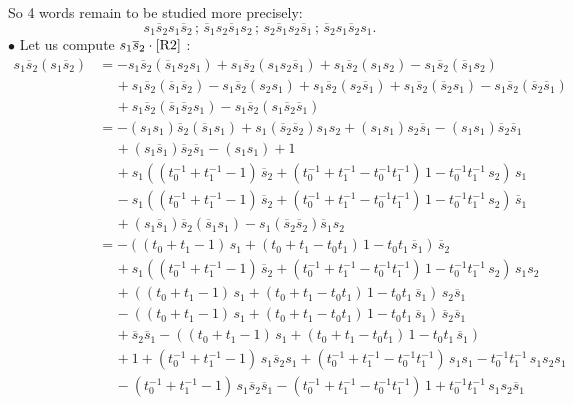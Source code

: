 \documentclass[12pt,reqno]{amsart}
\theoremstyle{definition}
\def\hs{\overline{s}}
\begin{document}
So 4 words remain to be studied more precisely:
$$
s_1 \hs_2 s_1 \hs_2 \,;\, \hs_1 s_2 \hs_1 s_2 \,;\, s_2 \hs_1 s_2 \hs_1
\,;\, \hs_2 s_1 \hs_2 s_1 .
$$
$\bullet$ \ovalbox{Case of $s_1 \hs_2 s_1 \hs_2$.} 
Let us compute $s_1 \hs_2 \cdot \eqref{R2}$ :
\begin{align*}
s_1 \hs_2 (s_1 \hs_2) & =  - s_1 \hs_2(\hs_1 s_2 s_1)
+ s_1 \hs_2(s_1 s_2 \hs_1) + s_1 \hs_2(s_1 s_2) - s_1 \hs_2(\hs_1 s_2) \\
& \phantom{sii} + s_1 \hs_2(\hs_1 \hs_2) - s_1 \hs_2(s_2 s_1)
+ s_1 \hs_2(s_2 \hs_1) + s_1 \hs_2(\hs_2 s_1) - s_1 \hs_2(\hs_2 \hs_1)\\
& \phantom{sii} + s_1 \hs_2(\hs_1 \hs_2 s_1) - s_1 \hs_2(s_1 \hs_2 \hs_1) \\
&  = - (s_1 s_1) \hs_2 (\hs_1 s_1) + s_1 (\hs_2 \hs_2) s_1 s_2
 + (s_1 s_1) s_2 \hs_1 - (s_1 s_1) \hs_2 \hs_1 \\
& \phantom{sii} + (s_1 \hs_1) \hs_2 \hs_1 - (s_1 s_1) + 1 \\
& \phantom{sii} + s_1 ((t_0^{-1} + t_1^{-1} -1) \, \hs_2 +(t_0^{-1}
+ t_1^{-1} - t_0^{-1} t_1^{-1}) \, 1 - t_0^{-1} t_1^{-1} \, s_2) \, s_1\\
&\phantom{sii} - s_1((t_0^{-1} + t_1^{-1} -1) \, \hs_2 +(t_0^{-1}
+ t_1^{-1} - t_0^{-1} t_1^{-1}) \, 1 - t_0^{-1} t_1^{-1} \, s_2)\, \hs_1\\
&\phantom{sii} + (s_1 \hs_1) \hs_2 (\hs_1 s_1) - s_1 (\hs_2 \hs_2) \hs_1 s_2 \\
&  =  - ((t_0 + t_1 -1) \, s_1 +(t_0 + t_1 - t_0 t_1) \, 1 - t_0 t_1 \, \hs_1)\,
\hs_2 \\
&\phantom{sii} +  s_1 ((t_0^{-1} + t_1^{-1} -1) \, \hs_2 +(t_0^{-1} + t_1^{-1}
- t_0^{-1} t_1^{-1}) \, 1 - t_0^{-1} t_1^{-1} \, s_2) \, s_1 s_2 \\
&\phantom{sii} + ((t_0 + t_1 -1) \, s_1 +(t_0 + t_1 - t_0 t_1) \,
1 - t_0 t_1 \, \hs_1)\,s_2 \hs_1\\
&\phantom{sii} - ((t_0 + t_1 -1) \, s_1 +(t_0 + t_1 - t_0 t_1) \,
1 - t_0 t_1 \, \hs_1)\, \hs_2 \hs_1 \\
&\phantom{sii} + \hs_2 \hs_1 
- ((t_0 + t_1 -1) \, s_1 +(t_0 + t_1 - t_0 t_1) \,
1 - t_0 t_1 \, \hs_1)\\
&\phantom{sii} + 1 + (t_0^{-1} + t_1^{-1} -1) \, s_1 \hs_2 s_1
+ (t_0^{-1} + t_1^{-1} - t_0^{-1} t_1^{-1}) \, s_1 s_1 
- t_0^{-1} t_1^{-1}\, s_1 s_2 s_1 \\
&\phantom{sii} - (t_0^{-1} + t_1^{-1} -1) \, s_1 \hs_2 \hs_1 - (t_0^{-1}
+ t_1^{-1} - t_0^{-1} t_1^{-1}) \, 1 + t_0^{-1} t_1^{-1} \, s_1 s_2 \hs_1 \\

\end{align*}
\end{document}
